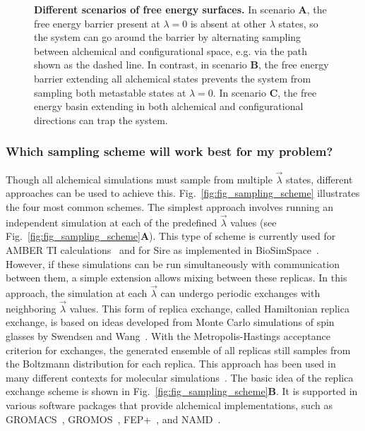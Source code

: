 \documentclass[9pt,bestpractices,pubversion]{livecoms}
\begin{document}
\begin{figure}
    \caption{\textbf{Different scenarios of free energy surfaces.} In scenario \textbf{A}, the free energy barrier present at $\lambda=0$ is absent at other $\lambda$ states, so the system can go around the barrier by alternating sampling between alchemical and configurational space, e.g. via the path shown as the dashed line. In contrast, in scenario \textbf{B}, the free energy barrier extending all alchemical states prevents the system from sampling both metastable states at $\lambda=0$. In scenario \textbf{C}, the free energy basin extending in both alchemical and configurational directions can trap the system.}
    \label{fig:configurational_sampling}
\end{figure} 


\subsubsection{Which sampling scheme will work best for my problem?}
\label{sec:sampling_schemes}
Though all alchemical simulations must sample from multiple $\vec{\lambda}$ states, different approaches can be used to achieve this. Fig.~\ref{fig:fig_sampling_scheme} illustrates the four most common schemes. The simplest approach involves running an independent simulation at each of the predefined $\vec{\lambda}$ values (see Fig.~\ref{fig:fig_sampling_scheme}\textbf{A}). This type of scheme is currently used for AMBER TI calculations~\cite{song2019using} and for Sire as implemented in BioSimSpace~\cite{hedges2019biosimspace}. However, if these simulations can be run simultaneously with communication between them, a simple extension allows mixing between these replicas. In this approach, the simulation at each $\vec{\lambda}$ can undergo periodic exchanges with neighboring $\vec{\lambda}$ values. This form of replica exchange, called Hamiltonian replica exchange, is based on ideas developed from Monte Carlo simulations of spin glasses by Swendsen and Wang~\cite{swendsen1986replica}. With the Metropolis-Hastings acceptance criterion for exchanges, the generated ensemble of all replicas still samples from the Boltzmann distribution for each replica. This approach has been used in many different contexts for molecular simulations~\cite{sugita2000multidimensional,sugita1999replicaexchange, woods2003development, jiang2010free}. The basic idea of the replica exchange scheme is shown in Fig.~\ref{fig:fig_sampling_scheme}\textbf{B}. It is supported in various software packages that provide alchemical implementations, such as GROMACS~\cite{aldeghi2015accurate}, GROMOS~\cite{hritz2008hamiltonian,hritz2007optimization}, FEP+~\cite{wang2015accurate}, and NAMD~\cite{jiang2019computing}. 
\end{document}
